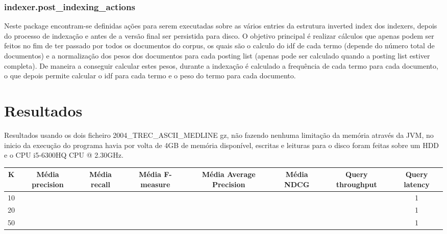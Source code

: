 \documentclass[12pt]{article}
\begin{document}
\subsubsection{indexer.post\_indexing\_actions}

Neste package encontram-se definidas ações para serem executadas
sobre as vários entries da estrutura inverted index dos indexers,
depois do processo de indexação e antes de a versão final ser
persistida para disco. O objetivo principal é realizar cálculos
que apenas podem ser feitos no fim de ter passado por todos os
documentos do corpus, os quais são o calculo do idf de cada termo
(depende do número total de documentos) e a normalização dos pesos
dos documentos para cada posting list (apenas pode ser calculado
quando a posting list estiver completa). De maneira a conseguir
calcular estes pesos, durante a indexação é calculado a frequência
de cada termo para cada documento, o que depois permite calcular
o idf para cada termo e o peso do termo para cada documento.

\newpage

\section{Resultados}

Resultados usando os dois ficheiro 2004\_TREC\_ASCII\_MEDLINE gz,
não fazendo nenhuma limitação da memória através da JVM,  no
inicio da execução do programa havia por volta de 4GB de memória
disponível, escritas e leituras  para o disco foram feitas sobre
um HDD e o CPU i5-6300HQ CPU @ 2.30GHz.

{
\tiny
\begin{tabular}{| c | c | c | c | c | c | c | c |}
        \hline K
        & \bf  Média precision
        & \bf  Média recall
        & \bf  Média F-measure
        & \bf  Média Average Precision
        & \bf  Média NDCG
        & \bf  Query throughput
        & \bf  Query latency \\

        \hline 10
        &
        &
        &
        &
        &
        &
        & 1 \\

        \hline 20
        &
        &
        &
        &
        &
        &
        & 1 \\

        \hline 50
        &
        &
        &
        &
        &
        &
        & 1 \\
        \hline

\end{tabular}
}
\end{document}
